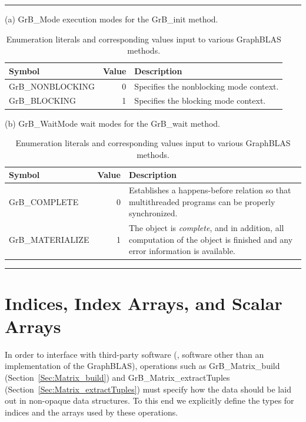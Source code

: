 \begin{table}[h]
\hrule
\begin{center}
\caption{Enumeration literals and corresponding values input to various GraphBLAS methods.}
\label{Tab:EnumerationModes}

\vspace{1\baselineskip}
(a) {\sf GrB\_Mode} execution modes for the {\sf GrB\_init} method.
\vspace{1\baselineskip}

\begin{tabular}{l|r|p{4in}}
Symbol    & Value & Description \\ \hline
{\sf GrB\_NONBLOCKING}   &  0 & Specifies the nonblocking mode context.\\
{\sf GrB\_BLOCKING}      &  1 & Specifies the blocking mode context. \\
\end{tabular}

\vspace{2\baselineskip}
(b) {\sf GrB\_WaitMode} wait modes for the {\sf GrB\_wait} method.
\vspace{1\baselineskip}

\begin{tabular}{l|r|p{4in}}
Symbol    & Value & Description \\ \hline
{\sf GrB\_COMPLETE}    &  0 & Establishes a happens-before relation so that multithreaded programs can be properly synchronized.\\
{\sf GrB\_MATERIALIZE} &  1 & The object is \emph{complete}, and in addition, all computation of the object is finished and any error information is available. \\
\end{tabular}

\end{center}
\hrule
\end{table}

\section{Indices, Index Arrays, and Scalar Arrays}

In order to interface with third-party software (\ie, software other than
an implementation of the GraphBLAS), operations 
such as {\sf GrB\_Matrix\_build} (Section~\ref{Sec:Matrix_build}) and
{\sf GrB\_Matrix\_extractTuples} (Section~\ref{Sec:Matrix_extractTuples}) must specify
how the data should be laid out in  non-opaque data structures.  To 
this end we explicitly define the types for indices and the arrays 
used by these operations.

